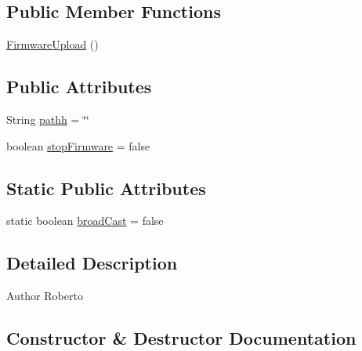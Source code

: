 \subsection*{Public Member Functions}
\begin{DoxyCompactItemize}
\item 
\hyperlink{classcom_1_1eneri_1_1scorpio__metertool_1_1ui_1_1_firmware_upload_a3490fadf175a4cbea49312847fd4f6aa}{Firmware\+Upload} ()
\end{DoxyCompactItemize}
\subsection*{Public Attributes}
\begin{DoxyCompactItemize}
\item 
String \hyperlink{classcom_1_1eneri_1_1scorpio__metertool_1_1ui_1_1_firmware_upload_a4b2f25355d0c8d6eda08365e9070dcea}{pathh} = \char`\"{}\char`\"{}
\item 
boolean \hyperlink{classcom_1_1eneri_1_1scorpio__metertool_1_1ui_1_1_firmware_upload_aae3643f054f8f4f9f86b6805dba8681e}{stop\+Firmware} = false
\end{DoxyCompactItemize}
\subsection*{Static Public Attributes}
\begin{DoxyCompactItemize}
\item 
static boolean \hyperlink{classcom_1_1eneri_1_1scorpio__metertool_1_1ui_1_1_firmware_upload_a06dc13c298ac0fb91e4ed77c9bf71db2}{broad\+Cast} = false
\end{DoxyCompactItemize}


\subsection{Detailed Description}
\begin{DoxyAuthor}{Author}
Roberto 
\end{DoxyAuthor}


\subsection{Constructor \& Destructor Documentation}
\mbox{\label{classcom_1_1eneri_1_1scorpio__metertool_1_1ui_1_1_firmware_upload_a3490fadf175a4cbea49312847fd4f6aa}} 
